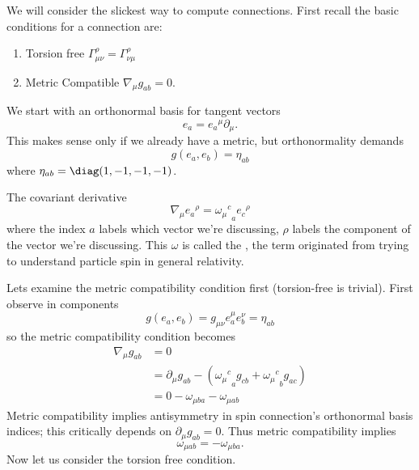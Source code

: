 
We will consider the slickest way to compute connections. First
recall the basic conditions for a connection are: 
\begin{enumerate}
\item Torsion free $\Gamma^{\rho}_{\mu\nu}=\Gamma^{\rho}_{\nu\mu}$
\item Metric Compatible $\nabla_{\mu}g_{ab}=0$.
\end{enumerate}
We start with an orthonormal basis for tangent vectors
\begin{equation}
e_{a}={e_{a}}^{\mu}\partial_{\mu}.
\end{equation}
This makes sense only if we already have a metric, but
orthonormality demands
\begin{equation}
g(e_{a},e_{b})=\eta_{ab}
\end{equation}
where $\eta_{ab}=\diag(1,-1,-1,-1)$.

The covariant derivative
\begin{equation}\label{eq:lec12:covariantDerivativeOfTetrad}
\nabla_{\mu}{e_{a}}^{\rho}={{\omega_{\mu}}^{c}}_{a}{e_{c}}^{\rho}
\end{equation}
where the index $a$ labels which vector we're discussing, $\rho$
labels the component of the vector we're discussing. This
$\omega$ is called the , the term
originated from trying to understand particle spin in general
relativity.

Lets examine the metric compatibility condition first
(torsion-free is trivial). First observe in components
\begin{equation}
g(e_{a},e_{b})=g_{\mu\nu}e^{\mu}_{a}e^{\nu}_{b}=\eta_{ab}
\end{equation}
so the metric compatibility condition becomes
\begin{subequations}
\begin{align}
\nabla_{\mu}g_{ab}
&=0\\
&=\partial_{\mu}g_{ab}-
({{\omega_{\mu}}^{c}}_{a}g_{cb}+{{\omega_{\mu}}^{c}}_{b}g_{ac})\\
&=0-\omega_{\mu ba}-\omega_{\mu ab}
\end{align}
\end{subequations}
Metric compatibility implies antisymmetry in spin connection's
orthonormal basis indices; this critically depends on
$\partial_{\mu}g_{ab}=0$. Thus metric compatibility implies
\begin{equation}
\omega_{\mu ab}=-\omega_{\mu ba}.
\end{equation}
Now let us consider the torsion free condition.

